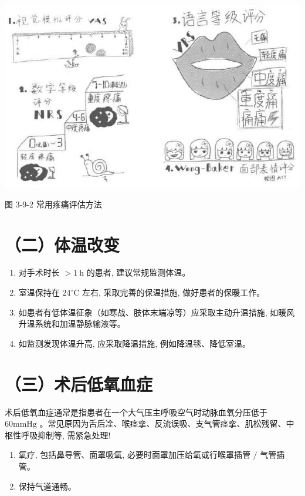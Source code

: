 \documentclass[10pt]{article}
\begin{document}
\begin{center}
\includegraphics[max width=\textwidth]{2024_07_05_645bb794a4d4f32ee0c8g-169}
\end{center}

图 3-9-2 常用疼痛评估方法

\section*{（二）体温改变}
\begin{enumerate}
  \item 对手术时长 $>1 \mathrm{~h}$ 的患者, 建议常规监测体温。

  \item 室温保持在 $24^{\circ} \mathrm{C}$ 左右, 采取完善的保温措施, 做好患者的保暖工作。

  \item 如患者有低体温征象（如寒战、肢体末端凉等）应采取主动升温措施, 如暖风升温系统和加温静脉输液等。

  \item 如监测发现体温升高, 应采取降温措施, 例如降温毯、降低室温。

\end{enumerate}

\section*{（三）术后低氧血症}
术后低氧血症通常是指患者在一个大气压主呼吸空气时动脉血氧分压低于 $60 \mathrm{mmHg}$ 。常见原因为舌后㓌、喉痉挛、反流误吸、支气管痉挛、肌松残留、中枢性呼吸抑制等, 需紧急处理!

\begin{enumerate}
  \item 氧疗, 包括鼻导管、面罩吸氧, 必要时面罩加压给氧或行喉罩插管 $/$ 气管插管。

  \item 保持气道通畅。

\end{enumerate}
\end{document}
